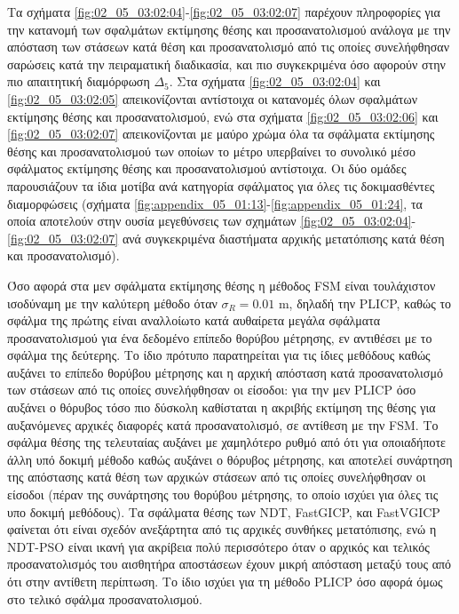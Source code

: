 Τα σχήματα \ref{fig:02_05_03:02:04}-\ref{fig:02_05_03:02:07} παρέχουν
πληροφορίες για την κατανομή των σφαλμάτων εκτίμησης θέσης και προσανατολισμού
ανάλογα με την απόσταση των στάσεων κατά θέση και προσανατολισμό από τις οποίες
συνελήφθησαν σαρώσεις κατά την πειραματική διαδικασία, και πιο συγκεκριμένα όσο
αφορούν στην πιο απαιτητική διαμόρφωση $\Delta_5$. Στα σχήματα
\ref{fig:02_05_03:02:04} και \ref{fig:02_05_03:02:05} απεικονίζονται αντίστοιχα
οι κατανομές όλων σφαλμάτων εκτίμησης θέσης και προσανατολισμού, ενώ στα
σχήματα \ref{fig:02_05_03:02:06} και \ref{fig:02_05_03:02:07} απεικονίζονται με
μαύρο χρώμα όλα τα σφάλματα εκτίμησης θέσης και προσανατολισμού των οποίων το
μέτρο υπερβαίνει το συνολικό μέσο σφάλματος εκτίμησης θέσης και προσανατολισμού
αντίστοιχα. Οι δύο ομάδες παρουσιάζουν τα ίδια μοτίβα ανά κατηγορία σφάλματος
για όλες τις δοκιμασθέντες διαμορφώσεις (σχήματα
\ref{fig:appendix_05_01:13}-\ref{fig:appendix_05_01:24}, τα οποία αποτελούν
στην ουσία μεγεθύνσεις των σχημάτων
\ref{fig:02_05_03:02:04}-\ref{fig:02_05_03:02:07} ανά συγκεκριμένα διαστήματα
αρχικής μετατόπισης κατά θέση και προσανατολισμό).

Όσο αφορά στα μεν σφάλματα εκτίμησης θέσης η μέθοδος FSM είναι τουλάχιστον
ισοδύναμη με την καλύτερη μέθοδο όταν $\sigma_R = 0.01$ m, δηλαδή την PLICP,
καθώς το σφάλμα της πρώτης είναι αναλλοίωτο κατά αυθαίρετα μεγάλα σφάλματα
προσανατολισμού για ένα δεδομένο επίπεδο θορύβου μέτρησης, εν αντιθέσει με το
σφάλμα της δεύτερης. Το ίδιο πρότυπο παρατηρείται για τις ίδιες μεθόδους καθώς
αυξάνει το επίπεδο θορύβου μέτρησης και η αρχική απόσταση κατά προσανατολισμό
των στάσεων από τις οποίες συνελήφθησαν οι είσοδοι: για την μεν PLICP όσο
αυξάνει ο θόρυβος τόσο πιο δύσκολη καθίσταται η ακριβής εκτίμηση της θέσης για
αυξανόμενες αρχικές διαφορές κατά προσανατολισμό, σε αντίθεση με την FSM. Το
σφάλμα θέσης της τελευταίας αυξάνει με χαμηλότερο ρυθμό από ότι για οποιαδήποτε
άλλη υπό δοκιμή μέθοδο καθώς αυξάνει ο θόρυβος μέτρησης, και αποτελεί συνάρτηση
της απόστασης κατά θέση των αρχικών στάσεων από τις οποίες συνελήφθησαν οι
είσοδοι (πέραν της συνάρτησης του θορύβου μέτρησης, το οποίο ισχύει για όλες
τις υπο δοκιμή μεθόδους). Τα σφάλματα θέσης των NDT, FastGICP, και FastVGICP
φαίνεται ότι είναι σχεδόν ανεξάρτητα από τις αρχικές συνθήκες μετατόπισης, ενώ
η NDT-PSO είναι ικανή για ακρίβεια πολύ περισσότερο όταν ο αρχικός και τελικός
προσανατολισμός του αισθητήρα αποστάσεων έχουν μικρή απόσταση μεταξύ τους από
ότι στην αντίθετη περίπτωση. Το ίδιο ισχύει για τη μέθοδο PLICP όσο αφορά όμως
στο τελικό σφάλμα προσανατολισμού.

